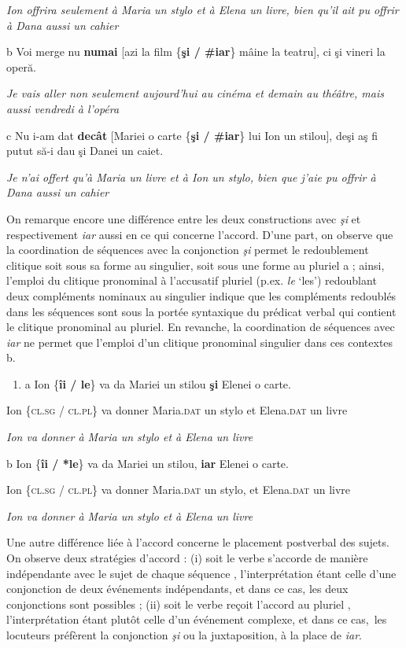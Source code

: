 {\itshape
Ion offrira seulement à Maria un stylo et à Elena un livre, bien qu'il ait pu offrir à Dana aussi un cahier}

  b  Voi merge nu\textbf{ numai} [azi la film \{\textbf{şi / \#iar}\} mâine la teatru], ci şi vineri la operă.

{\itshape
Je vais aller non seulement aujourd'hui au cinéma et demain au théâtre, mais aussi vendredi à l'opéra} 

  c  Nu i-am dat \textbf{decât} [Mariei o carte \{\textbf{şi / \#iar}\} lui Ion un stilou], deşi aş fi putut să-i dau şi Danei un caiet.

{\itshape
Je n'ai offert qu'à Maria un livre et à Ion un stylo, bien que j'aie pu offrir à Dana aussi un cahier } 

On remarque encore une différence entre les deux constructions avec \textit{şi} et respectivement \textit{iar} aussi en ce qui concerne l'accord. D'une part, on observe que la coordination de séquences avec la conjonction \textit{şi} permet le redoublement clitique soit sous sa forme au singulier, soit sous une forme au pluriel a ; ainsi, l'emploi du clitique pronominal à l'accusatif pluriel (p.ex. \textit{le} `les') redoublant deux compléments nominaux au singulier indique que les compléments redoublés dans les séquences sont sous la portée syntaxique du prédicat verbal qui contient le clitique pronominal au pluriel. En revanche, la coordination de séquences avec \textit{iar} ne permet que l'emploi d'un clitique pronominal singulier dans ces contextes b. 


\begin{enumerate}
\item \label{bkm:Ref302401718}a  Ion \{\textbf{îi / le}\} va da Mariei un stilou \textbf{şi} Elenei o carte.


\end{enumerate}
Ion \{\textsc{cl.sg / cl.pl\}} va donner Maria.\textsc{dat} un stylo et Elena.\textsc{dat} un livre

{\itshape
Ion va donner à Maria un stylo et à Elena un livre}

  b  Ion \{\textbf{îi / *le}\} va da Mariei un stilou, \textbf{iar} Elenei o carte.

    Ion \{\textsc{cl.sg / cl.pl\}} va donner Maria.\textsc{dat} un stylo, et Elena.\textsc{dat} un livre

{\itshape
Ion va donner à Maria un stylo et à Elena un livre} 

Une autre différence liée à l'accord concerne le placement postverbal des sujets. On observe deux stratégies d'accord : (i) soit le verbe s'accorde de manière indépendante avec le sujet de chaque séquence , l'interprétation étant celle d'une conjonction de deux événements indépendants, et dans ce cas, les deux conjonctions sont possibles ; (ii) soit le verbe reçoit l'accord au pluriel , l'interprétation étant plutôt celle d'un événement complexe, et dans ce cas,~les locuteurs préfèrent la conjonction \textit{şi} ou la juxtaposition, à la place de \textit{iar}. 


